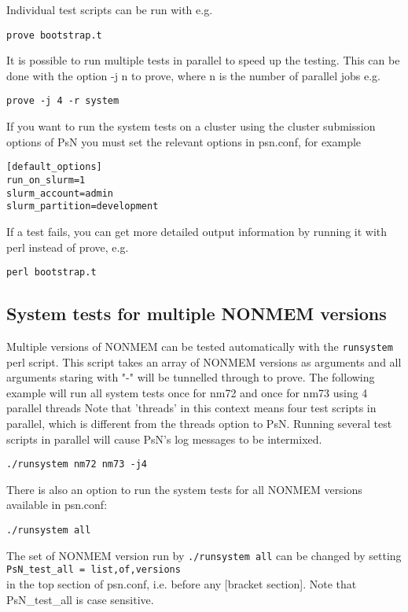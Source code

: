 Individual test scripts can be run with e.g. 
\begin{verbatim}
prove bootstrap.t
\end{verbatim}

It is possible to run multiple tests in parallel to speed up the testing. This can be done with the option -j n to prove, where n is the number of parallel jobs e.g.
\begin{verbatim}
prove -j 4 -r system
\end{verbatim}

If you want to run the system tests on a cluster using the cluster submission options of PsN 
you must set the relevant options in psn.conf, for example
\begin{verbatim}
[default_options]
run_on_slurm=1
slurm_account=admin
slurm_partition=development
\end{verbatim}

If a test fails, you can get more detailed output information by running it
with perl instead of prove, e.g.
\begin{verbatim}
perl bootstrap.t
\end{verbatim}

\subsection{System tests for multiple NONMEM versions}
Multiple versions of NONMEM can be tested automatically with the \verb|runsystem| perl script. This script takes
an array of NONMEM versions as arguments and all arguments staring with "-" will be tunnelled through to prove.
The following example will run all system tests once for nm72 and once for nm73 using 4 parallel threads
Note that 'threads' in this context means four test scripts in parallel, which is different from the
threads option to PsN. Running several test scripts in parallel will cause PsN's log messages to be intermixed.
\begin{verbatim}
./runsystem nm72 nm73 -j4
\end{verbatim}
There is also an option to run the system tests for all NONMEM versions available in psn.conf:
\begin{verbatim}
./runsystem all
\end{verbatim}
The set of NONMEM version run by \verb|./runsystem all| can be changed by setting\\
\verb|PsN_test_all = list,of,versions| \\
in the top section of psn.conf, i.e. before any [bracket section].
Note that PsN\_test\_all is case sensitive.

